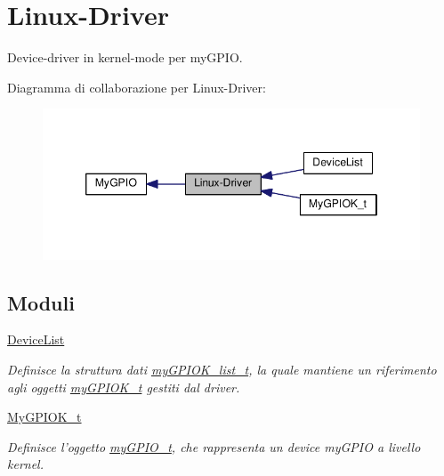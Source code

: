 \hypertarget{group___linux-_driver}{\section{Linux-\/\+Driver}
\label{group___linux-_driver}
}


Device-\/driver in kernel-\/mode per my\+G\+P\+I\+O.  


Diagramma di collaborazione per Linux-\/\+Driver\+:
\nopagebreak
\begin{figure}[H]
\begin{center}
\leavevmode
\includegraphics[width=346pt]{group___linux-_driver}
\end{center}
\end{figure}
\subsection*{Moduli}
\begin{DoxyCompactItemize}
\item 
\hyperlink{group___device_list}{Device\+List}
\begin{DoxyCompactList}\small\item\em Definisce la struttura dati \hyperlink{structmy_g_p_i_o_k__list__t}{my\+G\+P\+I\+O\+K\+\_\+list\+\_\+t}, la quale mantiene un riferimento agli oggetti \hyperlink{structmy_g_p_i_o_k__t}{my\+G\+P\+I\+O\+K\+\_\+t} gestiti dal driver. \end{DoxyCompactList}\item 
\hyperlink{group__my_g_p_i_o_k__t}{My\+G\+P\+I\+O\+K\+\_\+t}
\begin{DoxyCompactList}\small\item\em Definisce l'oggetto \hyperlink{structmy_g_p_i_o__t}{my\+G\+P\+I\+O\+\_\+t}, che rappresenta un device my\+G\+P\+I\+O a livello kernel. \end{DoxyCompactList}\end{DoxyCompactItemize}
